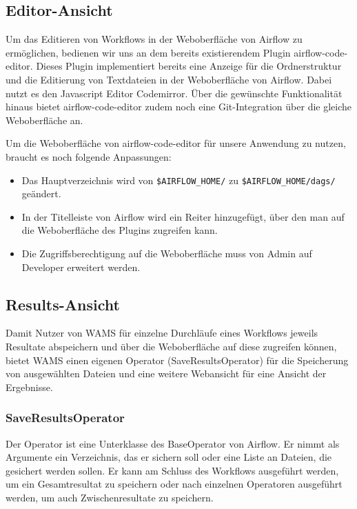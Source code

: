 \subsection{Editor-Ansicht}
Um das Editieren von Workflows in der Weboberfläche von Airflow zu ermöglichen, bedienen wir uns an dem bereits existierendem Plugin \gls{airflow-code-editor}. %
Dieses Plugin implementiert bereits eine Anzeige für die Ordnerstruktur und die Editierung von Textdateien in der Weboberfläche von Airflow.
Dabei nutzt es den Javascript Editor \gls{Codemirror}. Über die gewünschte Funktionalität hinaus bietet \gls{airflow-code-editor} zudem noch eine Git-Integration über die gleiche Weboberfläche an. %


Um die Weboberfläche von \gls{airflow-code-editor} für unsere Anwendung zu nutzen, braucht es noch folgende Anpassungen:

\begin{itemize}
    \item Das Hauptverzeichnis wird von \verb!$AIRFLOW_HOME/! zu \verb!$AIRFLOW_HOME/dags/! geändert.
    \item In der Titelleiste von Airflow wird ein Reiter hinzugefügt, über den man auf die Weboberfläche des Plugins zugreifen kann.
    \item Die Zugriffsberechtigung auf die Weboberfläche muss von Admin auf Developer erweitert werden.
\end{itemize}

\subsection{Results-Ansicht}
Damit Nutzer von WAMS für einzelne Durchläufe eines Workflows jeweils Resultate abspeichern und über die Weboberfläche auf diese zugreifen können, bietet WAMS einen eigenen Operator (SaveResultsOperator) für die Speicherung von ausgewählten Dateien und eine weitere Webansicht für eine Ansicht der Ergebnisse.

\subsubsection{SaveResultsOperator}
Der Operator ist eine Unterklasse des BaseOperator von Airflow. Er nimmt als Argumente ein Verzeichnis, das er sichern soll oder eine Liste an Dateien, die gesichert werden sollen. Er kann am Schluss des Workflows ausgeführt werden, um ein Gesamtresultat zu speichern oder nach einzelnen Operatoren ausgeführt werden, um auch Zwischenresultate zu speichern.

